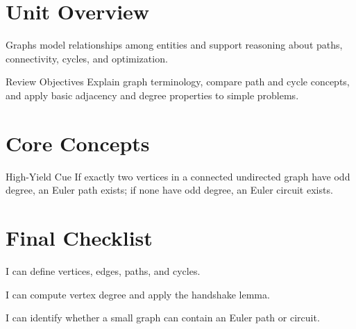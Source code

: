 \documentclass[10pt,letterpaper]{article}
\title{\CornellDocumentTitle}
\author{Documentation Team}
\date{\today}
\begin{document}
\maketitle

\section*{Unit Overview}
Graphs model relationships among entities and support reasoning about paths,
connectivity, cycles, and optimization.

\begin{summarybox}{Review Objectives}
Explain graph terminology, compare path and cycle concepts, and apply basic
adjacency and degree properties to simple problems.
\end{summarybox}

\section{Core Concepts}
\begin{cornell}
\end{cornell}

\begin{exambox}{High-Yield Cue}
If exactly two vertices in a connected undirected graph have odd degree, an
Euler path exists; if none have odd degree, an Euler circuit exists.
\end{exambox}

\section{Final Checklist}
\begin{CornellChecklist}
\item I can define vertices, edges, paths, and cycles.
\item I can compute vertex degree and apply the handshake lemma.
\item I can identify whether a small graph can contain an Euler path or circuit.
\end{CornellChecklist}
\end{document}
